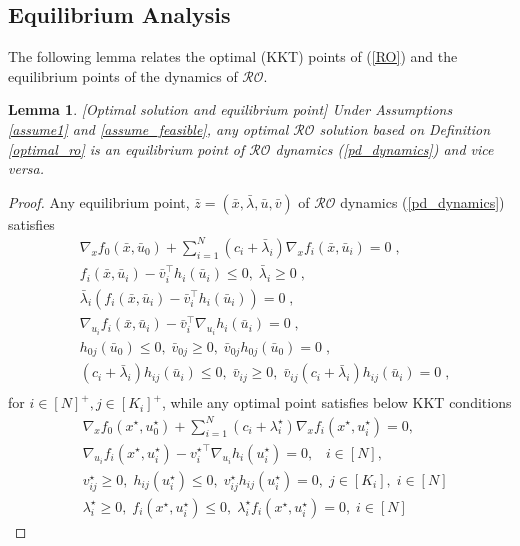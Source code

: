 \documentclass[journal,twoside,web]{ieeecolor}
\newtheorem{lemma}{Lemma}
\begin{document}
\subsection*{Equilibrium Analysis} \label{kkt<=>eq.sec}
 The following lemma relates the optimal (KKT) points of (\ref{RO}) and the equilibrium points of the dynamics of $\mathcal{RO}$.
\begin{lemma}\label{kkttoeq.lem}[Optimal solution and equilibrium point]
Under Assumptions \ref{assume1} and \ref{assume_feasible}, any optimal $\mathcal{RO}$ solution based on Definition \ref{optimal_ro} is an equilibrium point of $\mathcal{RO}$ dynamics (\ref{pd_dynamics}) and vice versa.
\end{lemma}
\begin{proof}
Any equilibrium point, $\bar{z}=(\bar{x},\bar{\lambda},\bar{u},\bar{v})$ of $\mathcal{RO}$ dynamics (\ref{pd_dynamics}) satisfies
\begin{align*}
&\nabla_x f_0(\bar x,\bar{u}_0)+  \sum_{i=1}^N (c_i+\bar \lambda_i) \nabla_x f_i(\bar x,\bar u_i)=0\;,\\
&f_{i}(\bar x,\bar u_i)-\bar v_i^\top h_i(\bar u_i)\leq 0,\;\bar \lambda_i\geq 0\;,\\
&\bar \lambda_i(f_{i}(\bar x,\bar u_i)-\bar v_i^\top h_i(\bar u_i))=0\;,\\
&\nabla_{u_i} f_i(\bar x,\bar u_i)-\bar v_i^\top \nabla_{u_i} h_i(\bar u_i)=0\;,\\
&h_{0j}(\bar u_0)\leq 0,\; \bar v_{0j}\geq 0,\;\bar v_{0j}h_{0j}(\bar u_0)=0\;,\\
& (c_i+\bar{\lambda}_i) h_{ij}(\bar u_i)\leq 0,\; \bar v_{ij}\geq 0,\;\bar v_{ij}(c_i+\bar \lambda_i) h_{ij}(\bar u_i)=0\;,\\
\end{align*}
for $i\in[N]^+,j\in[K_i]^+$, while any optimal point satisfies below KKT conditions
\begin{align}
    &\nabla_x f_0(x^\star,u_0^\star)+  \sum_{i=1}^N(c_i+\lambda^\star_i) \nabla_x f_i(x^\star,u_i^\star)=0, \label{kkt1_proof} \\
    &\nabla_{u_i} f_i(x^\star,u_i^\star)-{v_i^\star}^\top \nabla_{u_i} h_i(u_i^\star)=0, \;\;\; i \in [N], \label{kkt2_proof} \\
    &v_{ij}^\star\geq 0,\; h_{ij}(u_i^\star)\leq 0,\;v_{ij}^\star h_{ij}(u_i^\star)=0, \; j \in [K_i], \; i \in [N] \label{kkt3_proof} \\
    &\lambda_i^\star\geq 0,\;f_{i}(x^\star,u_i^\star)\leq 0,\;\lambda_i^\star f_{i}(x^\star,u_i^\star)=0, \; i \in [N] \label{kkt4_proof}
\end{align}


\end{proof}
\end{document}
